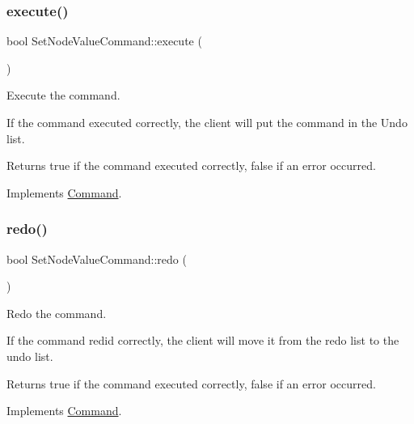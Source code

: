 \subsubsection{\texorpdfstring{execute()}{execute()}}
{\footnotesize\ttfamily bool Set\+Node\+Value\+Command\+::execute (\begin{DoxyParamCaption}{ }\end{DoxyParamCaption})\hspace{0.3cm}{\ttfamily [virtual]}}



Execute the command. 

If the command executed correctly, the client will put the command in the Undo list. \begin{DoxyReturn}{Returns}
true if the command executed correctly, false if an error occurred. 
\end{DoxyReturn}


Implements \mbox{\hyperlink{class_command_a5d83cdea649a79d7b7253196a6deddeb}{Command}}.

\mbox{\label{class_set_node_value_command_a839cb93ffcaab91e245995aa367e07c7}} 
\subsubsection{\texorpdfstring{redo()}{redo()}}
{\footnotesize\ttfamily bool Set\+Node\+Value\+Command\+::redo (\begin{DoxyParamCaption}{ }\end{DoxyParamCaption})\hspace{0.3cm}{\ttfamily [virtual]}}



Redo the command. 

If the command redid correctly, the client will move it from the redo list to the undo list. \begin{DoxyReturn}{Returns}
true if the command executed correctly, false if an error occurred. 
\end{DoxyReturn}


Implements \mbox{\hyperlink{class_command_ab222d875ec449c40467173edb28e5460}{Command}}.

\mbox{\label{class_set_node_value_command_a794bfa7e64469fa6528179d2ca807cc3}} 
